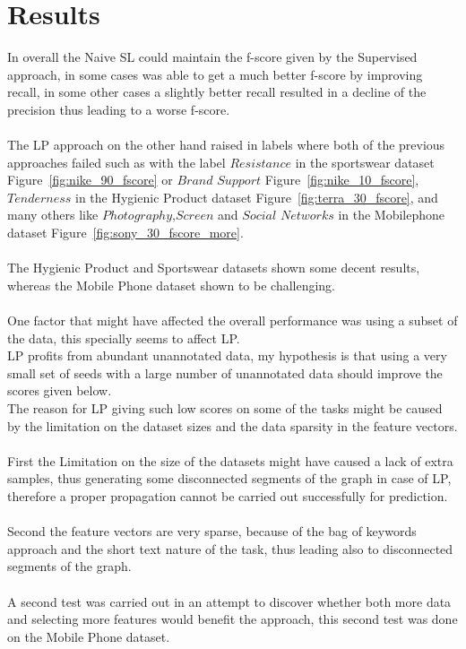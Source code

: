 \documentclass[4pt,a4paper,twocolumn]{article}
\begin{document}
\section{Results}
In overall the Naive SL could maintain the f-score given by the Supervised approach, in some cases was able to get a much better f-score by improving recall, in some other cases a slightly better recall resulted in a decline of the precision thus leading to a worse f-score.\\
\\
The LP approach on the other hand raised in labels where both of the previous approaches failed such as with the label $Resistance$  in the sportswear dataset Figure~\ref{fig:nike_90_fscore} or $Brand$ $Support$ Figure~\ref{fig:nike_10_fscore},  $Tenderness$  in the Hygienic Product dataset Figure~\ref{fig:terra_30_fscore}, and many others like $Photography$,$Screen$ and $Social$ $Networks$ in the Mobilephone dataset Figure~\ref{fig:sony_30_fscore_more}.\\
\\
The Hygienic Product and Sportswear datasets shown some decent results, whereas the Mobile Phone dataset shown to be challenging.\\
\\
One factor that might have affected the overall performance was using a subset of the data, this specially seems to affect LP.\\
LP profits from abundant unannotated data, my hypothesis is that using a very small set of seeds with a large number of unannotated data should improve the scores given below.\\
The reason for LP giving such low scores  on some of the tasks might be caused by the limitation on the dataset sizes and the data sparsity in the feature vectors.\\
\\
First the Limitation on the size of the datasets might have caused a lack of extra samples, thus  generating some disconnected segments of the graph in case of LP, therefore a proper propagation cannot be carried out successfully for prediction.\\
\\
Second the feature vectors are very sparse, because of the bag of keywords approach and the short text nature of the task, thus leading also to disconnected segments of the graph.\\
\\
A second test was carried out in an attempt to discover whether both more data and selecting more features would benefit the approach, this second test was done on the Mobile Phone dataset.\\
\end{document}
